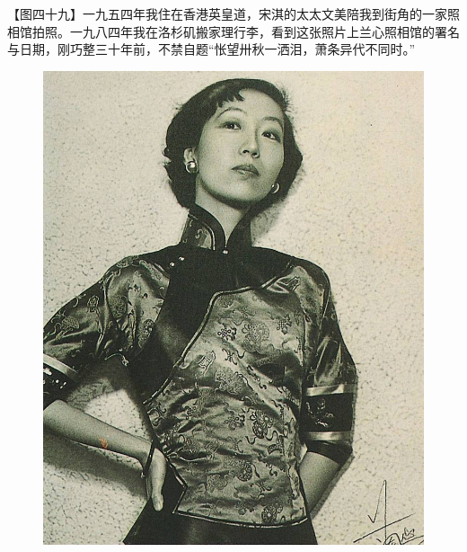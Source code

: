\clearpage
\par 【图四十九】一九五四年我住在香港英皇道，宋淇的太太文美陪我到街角的一家照相馆拍照。一九八四年我在洛杉矶搬家理行李，看到这张照片上兰心照相馆的署名与日期，刚巧整三十年前，不禁自题“怅望卅秋一洒泪，萧条异代不同时。”
\begin{figure}[htb]
    \centering %
    \includegraphics[scale=0.4]{picture/对照记49.jpeg}
\end{figure}


